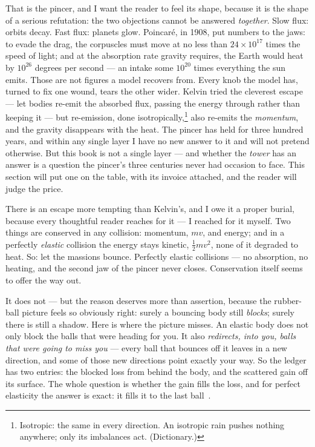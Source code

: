 \documentclass[fontsize=11pt,paper=a4,pagesize=auto,parskip=half-]{scrbook}
\begin{document}
That is the pincer, and I want the reader to feel its shape, because it is the shape of a serious refutation: the two objections cannot be answered \emph{together}. Slow flux: orbits decay. Fast flux: planets glow. Poincar\'e, in 1908, put numbers to the jaws: to evade the drag, the corpuscles must move at no less than $24\times10^{17}$ times the speed of light; and at the absorption rate gravity requires, the Earth would heat by $10^{26}$ degrees per second --- an intake some $10^{20}$ times everything the sun emits. Those are not figures a model recovers from. Every knob the model has, turned to fix one wound, tears the other wider. Kelvin tried the cleverest escape --- let bodies re-emit the absorbed flux, passing the energy through rather than keeping it --- but re-emission, done isotropically,\footnote{Isotropic: the same in every direction. An isotropic rain pushes nothing anywhere; only its imbalances act. (Dictionary.)} also re-emits the \emph{momentum}, and the gravity disappears with the heat. The pincer has held for three hundred years, and within any single layer I have no new answer to it and will not pretend otherwise. But this book is not a single layer --- and whether the \emph{tower} has an answer is a question the pincer's three centuries never had occasion to face. This section will put one on the table, with its invoice attached, and the reader will judge the price.


There is an escape more tempting than Kelvin's, and I owe it a proper burial, because every thoughtful reader reaches for it --- I reached for it myself. Two things are conserved in any collision: momentum, $mv$, and energy; and in a perfectly \emph{elastic} collision the energy stays kinetic, $\tfrac{1}{2}mv^{2}$, none of it degraded to heat. So: let the massions bounce. Perfectly elastic collisions --- no absorption, no heating, and the second jaw of the pincer never closes. Conservation itself seems to offer the way out.

It does not --- but the reason deserves more than assertion, because the rubber-ball picture feels so obviously right: surely a bouncing body still \emph{blocks}; surely there is still a shadow. Here is where the picture misses. An elastic body does not only block the balls that were heading for you. It also \emph{redirects, into you, balls that were going to miss you} --- every ball that bounces off it leaves in a new direction, and some of those new directions point exactly your way. So the ledger has two entries: the blocked loss from behind the body, and the scattered gain off its surface. The whole question is whether the gain fills the loss, and for perfect elasticity the answer is exact: it fills it to the last ball~\cite{darwin1905}.
\end{document}
